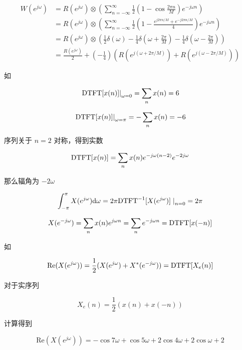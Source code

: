 \documentclass[lang=cn,11pt,a4paper,cite=authoryear]{elegantpaper}
\begin{document}

\[
\begin{aligned}
    W(e^{j\omega}) &= R(e^{j\omega}) \otimes (\sum_{n=-\infty}^{\infty} \frac{1}{2} (1 - \cos \frac{2 \pi n}{M}) e^{-j\omega n}) \\
    &= R(e^{j\omega}) \otimes (\sum_{n=-\infty}^{\infty} \frac{1}{2} (1 - \frac{e^{j 2 \pi n / M} + e^{-j 2 \pi n / M}}{4}) e^{-j\omega n}) \\
    &= R(e^{j \omega}) \otimes (\frac{1}{2} \delta(\omega) -\frac{1}{4} \delta(\omega + \frac{2 \pi }{M}) - \frac{1}{4} \delta(\omega - \frac{2 \pi}{M}))\\
    &= \frac{R(e^{j\omega})}{2} + (-\frac{1}{4})(R(e^{j(\omega + 2\pi/M)}) + R(e^{j(\omega - 2\pi/M)}))
\end{aligned}
\]

如





\[\left.\text{DTFT}[x(n)]\right|_{\omega=0} = \sum_n x(n)  = 6\]


\[\left.\text{DTFT}[x(n)]\right|_{\omega = \pi} = - \sum_n x(n) = -6\]


序列关于 \(n = 2\) 对称，得到实数

\[\text{DTFT}[x(n)] = \sum_{n} x(n) e^{-j\omega(n-2)} e^{-2 j \omega}\]

那么辐角为 \(-2\omega\)


\[\int_{-\pi}^\pi X(e^{j \omega}) \mathrm{d}\omega = 2 \pi \text{DTFT}^{-1}[X(e^{j\omega})]\left.\right|_{n=0} = 2 \pi\]


\[X(e^{-j\omega}) = \sum_n x(n) e^{j\omega n} = \sum_n e^{-j\omega n} = \text{DTFT}[x(-n)]\]

如



\[\text{Re}(X(e^{j\omega})) = \frac{1}{2}(X(e^{j\omega}) + X^*{(e^{-j\omega})}) = \text{DTFT}[X_e(n)]\]

对于实序列

\[X_e(n) = \frac{1}{2}(x(n) + x(-n))\]

计算得到

\[\text{Re}(X(e^{j \omega})) = -\cos 7 \omega + \cos 5 \omega + 2 \cos 4 \omega + 2 \cos \omega + 2\]
\end{document}
